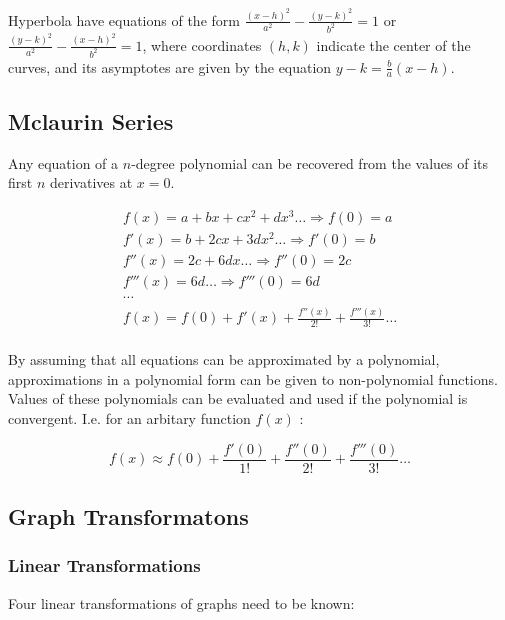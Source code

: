 \documentclass[../main]{subfiles}
\begin{document}
	Hyperbola have equations of the form \( \frac{(x-h)^2}{a^2} - \frac{(y-k)^2}{b^2} = 1 \) or \( \frac{(y-k)^2}{a^2} - \frac{(x-h)^2}{b^2} = 1 \), where coordinates \((h,k)\) indicate the center of the curves, and its asymptotes are given by the equation \( y - k = \frac{b}{a} (x - h) \). \\

\subsection{Mclaurin Series}
	
	Any equation of a \(n\)-degree polynomial can be recovered from the values of its first \(n\) derivatives at \(x=0\).

	\begin{equation*} \begin{gathered}
		f(x) = a + bx + cx^2 + dx^3 \ldots \Rightarrow f(0) = a \\
		f'(x) = b + 2cx + 3dx^2 \ldots \Rightarrow f'(0) = b \\
		f''(x) = 2c + 6dx \ldots \Rightarrow f''(0) = 2c \\
		f'''(x) = 6d \ldots \Rightarrow f'''(0) = 6d \\
		\cdots \\
		f(x) = f(0) + f'(x) + \frac{f''(x)}{2!} +  \frac{f'''(x)}{3 !} \ldots \\
	\end{gathered} \end{equation*}

	By assuming that all equations can be approximated by a polynomial, approximations in a polynomial form can be given to non-polynomial functions. Values of these polynomials can be evaluated and used if the polynomial is convergent. I.e. for an arbitary function \(f(x)\) :

	\[ f(x) \approx f(0) + \frac{f'(0)}{1!} + \frac{f''(0)}{2!} + \frac{f'''(0)}{3!} \ldots \]

\subsection{Graph Transformatons}

	\subsubsection{Linear Transformations}

	Four linear transformations of graphs need to be known:
\end{document}
